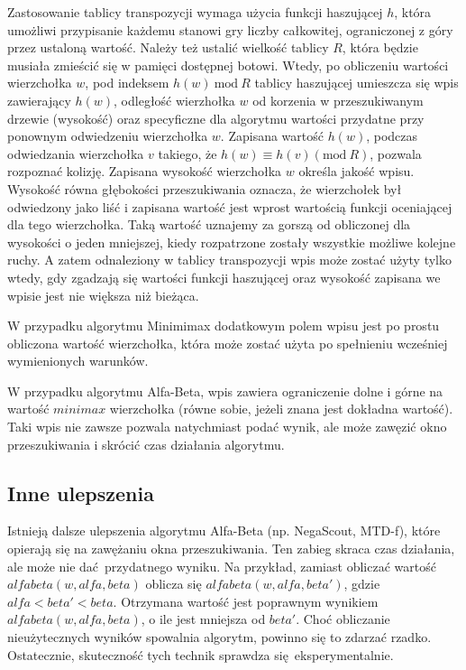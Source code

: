 \documentclass{pracamgr}
\begin{document}
Zastosowanie tablicy transpozycji wymaga użycia funkcji haszującej \(h\), która umożliwi przypisanie każdemu stanowi gry liczby całkowitej, ograniczonej z góry przez ustaloną wartość.
Należy też ustalić wielkość tablicy \(R\), która będzie musiała zmieścić się w pamięci dostępnej botowi.
Wtedy, po obliczeniu wartości wierzchołka \(w\), pod indeksem \(h(w)\ \textrm{mod}\ R\) tablicy haszującej umieszcza się wpis zawierający \(h(w)\), odległość wierzhołka \(w\) od korzenia w przeszukiwanym drzewie (wysokość) oraz specyficzne dla algorytmu wartości przydatne przy ponownym odwiedzeniu wierzchołka \(w\).
Zapisana wartość \(h(w)\), podczas odwiedzania wierzchołka \(v\) takiego, że \(h(w) \equiv h(v) (\textrm{mod}\ R)\), pozwala rozpoznać kolizję.
Zapisana wysokość wierzchołka \(w\) określa jakość wpisu.
Wysokość równa głębokości przeszukiwania oznacza, że wierzchołek był odwiedzony jako liść i zapisana wartość jest wprost wartością funkcji oceniającej dla tego wierzchołka.
Taką wartość uznajemy za gorszą od obliczonej dla wysokości o jeden mniejszej, kiedy rozpatrzone zostały wszystkie możliwe kolejne ruchy.
A zatem odnaleziony w tablicy transpozycji wpis może zostać użyty tylko wtedy, gdy zgadzają się wartości funkcji haszującej oraz wysokość zapisana we wpisie jest nie większa niż bieżąca.

W przypadku algorytmu Minimimax dodatkowym polem wpisu jest po prostu obliczona wartość wierzchołka, która może zostać użyta po spełnieniu wcześniej wymienionych warunków.

W przypadku algorytmu Alfa-Beta, wpis zawiera ograniczenie dolne i górne na wartość \(minimax\) wierzchołka (równe sobie, jeżeli znana jest dokładna wartość).
Taki wpis nie zawsze pozwala natychmiast podać wynik, ale może zawęzić okno przeszukiwania i skrócić czas działania algorytmu.

\subsection{Inne ulepszenia}

Istnieją dalsze ulepszenia algorytmu Alfa-Beta (np. NegaScout, MTD-f), które opierają się na zawężaniu okna przeszukiwania.
Ten zabieg skraca czas działania, ale może nie dać przydatnego wyniku.
Na przykład, zamiast obliczać wartość \(alfabeta(w, alfa, beta)\) oblicza się \(alfabeta(w, alfa, beta')\), gdzie \(alfa < beta' < beta\).
Otrzymana wartość jest poprawnym wynikiem \(alfabeta(w, alfa, beta)\), o ile jest mniejsza od \(beta'\).
Choć obliczanie nieużytecznych wyników spowalnia algorytm, powinno się to zdarzać rzadko.
Ostatecznie, skuteczność tych technik sprawdza się eksperymentalnie.
\end{document}
